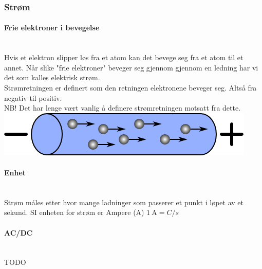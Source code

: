 \subsubsection{Strøm}
\paragraph{Frie elektroner i bevegelse} \mbox{} \\
Hvis et elektron slipper løs fra et atom kan det bevege seg fra et atom til et annet.
Når slike "frie elektroner" beveger seg gjennom gjennom en ledning
har vi det som kalles elektrisk strøm.
\\

Strømretningen er definert som den retningen elektronene beveger seg.
Altså fra negativ til positiv.\\
NB! Det har lenge vært vanlig å definere strømretningen motsatt fra dette.
\\
\includegraphics[scale=0.5]{./img/current}

\paragraph{Enhet} \mbox{} \\
Strøm måles etter hvor mange ladninger som passerer et punkt
i løpet av et sekund.
SI enheten for strøm er Ampere (A) \hfill $\SI{1}{\ampere} = C/s$

\paragraph{AC/DC} \mbox{} \\
TODO
